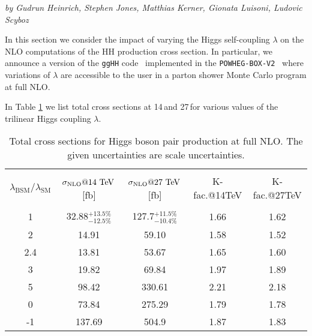\label{subsec:varylambda}

\begin{center}
\textit{by  Gudrun Heinrich, Stephen Jones, Matthias Kerner, Gionata Luisoni, Ludovic Scyboz}
\end{center}

In this section we consider the impact of varying the Higgs self-coupling $\lambda$ on the NLO computations of the HH production cross section.
In particular, we announce a version of the {\tt ggHH} code~\cite{Borowka:2016ypz,Heinrich:2017kxx,Borowka:2016ehy} implemented in the {\tt POWHEG-BOX-V2}~\cite{Alioli:2010xd} where variations of  $\lambda$ are accessible to the user in a parton shower Monte Carlo program at full NLO.


In Table \ref{tab:sigmatot} we list total cross sections at 14\,\UTeV and 27\,\UTeV for various values of the trilinear Higgs coupling $\lambda$. 
\begin{table}[htb]
\begin{center}
\begin{tabular}{| c | c | c |c|c|}
\hline
&&&&\\
$\lambda_{\mathrm{BSM}}/\lambda_{\mathrm{SM}}$ & $\sigma_{\rm{NLO}}@14 \mathrm{~\text{TeV}}$\,[fb] & $\sigma_{\rm{NLO}}@27 \mathrm{~\text{TeV}}$\,[fb] &K-fac.@14TeV&K-fac.@27TeV\\
&&&&\\
\hline
1& 32.88$^{+13.5\%}_{-12.5\%}$&127.7$^{+11.5\%}_{-10.4\%}$ &1.66&1.62\\
\hline
2 & 14.91 &  59.10 & 1.58 & 1.52\\
\hline
2.4 & 13.81& 53.67 & 1.65 & 1.60\\
\hline
3& 19.82 & 69.84 & 1.97 & 1.89\\
\hline 
5 & 98.42& 330.61 & 2.21 & 2.18\\
\hline 
0 & 73.84& 275.29& 1.79 & 1.78 \\
\hline 
-1 & 137.69& 504.9 & 1.87 & 1.83\\
\hline
\end{tabular}
\end{center}
\caption{Total cross sections for Higgs boson pair production at full NLO. The given uncertainties are scale uncertainties. 
\label{tab:sigmatot}}
\end{table}


